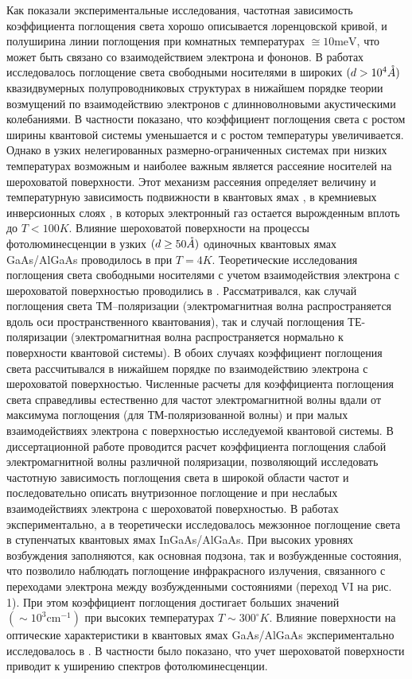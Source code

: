 {Как показали экспериментальные исследования, частотная зависимость коэффициента поглощения света хорошо описывается лоренцовской кривой, и полуширина линии поглощения при комнатных температурах $\cong 10 \text{meV}$, что может быть связано со взаимодействием электрона и фононов. В работах \cite{Wu1994,Spector1983} исследовалось поглощение света свободными носителями в широких $(d > 10^4 \AA)$ квазидвумерных полупроводниковых структурах в нижайшем порядке теории возмущений по взаимодействию электронов с длинноволновыми акустическими колебаниями. В частности показано, что коэффициент поглощения света с ростом ширины квантовой системы уменьшается и с ростом температуры увеличивается. Однако в узких нелегированных размерно-ограниченных системах при низких температурах возможным и наиболее важным является рассеяние носителей на шероховатой поверхности. Этот механизм рассеяния определяет величину и температурную зависимость подвижности в квантовых ямах \cite{Sakaki1987}, в кремниевых инверсионных слоях \cite{Stern1980}, в которых электронный газ остается вырожденным вплоть до $T < 100 K$. Влияние шероховатой поверхности на процессы фотолюминесценции в узких $(d \geq 50 \AA)$ одиночных квантовых ямах GaAs/AlGaAs  проводилось в \cite{Gurioli1991} при $T = 4 K$. Теоретические исследования поглощения света свободными носителями с учетом взаимодействия электрона с шероховатой поверхностью проводились в \cite{Vurgaftman1999}. Рассматривался, как случай поглощения света ТМ–поляризации (электромагнитная волна распространяется вдоль оси пространственного квантования), так и случай поглощения ТЕ-поляризации (электромагнитная волна распространяется нормально к поверхности квантовой системы). В обоих случаях коэффициент поглощения света рассчитывался в нижайшем порядке по взаимодействию электрона с шероховатой поверхностью. Численные расчеты для коэффициента поглощения света справедливы естественно для частот электромагнитной волны вдали от максимума поглощения (для ТМ-поляризованной волны) и при малых взаимодействиях электрона с поверхностью исследуемой квантовой системы. {\color{red} В диссертационной работе проводится расчет коэффициента поглощения слабой электромагнитной волны различной поляризации, позволяющий исследовать частотную зависимость поглощения света в широкой области частот и последовательно описать внутризонное поглощение и при неслабых взаимодействиях электрона с шероховатой поверхностью.}
В работах \cite{Aleshkin2002,Vorobiev2004} экспериментально, а в \cite{Thammasat1997} теоретически исследовалось межзонное поглощение света в ступенчатых квантовых ямах InGaAs/AlGaAs. При высоких уровнях возбуждения заполняются, как основная подзона, так и возбужденные состояния, что позволило наблюдать поглощение инфракрасного излучения, связанного с переходами электрона между возбужденными состояниями (переход VI на рис. 1). При этом коэффициент поглощения достигает больших значений $(\sim 10^3 \text{cm}^{-1})$ при высоких температурах $T\sim300^{\circ}K$. Влияние поверхности на оптические характеристики в квантовых ямах GaAs/AlGaAs экспериментально исследовалось в \cite{Gurioli1991,Weisbuch1981}. В частности было показано, что учет шероховатой поверхности приводит к уширению спектров фотолюминесценции.	
			
}
